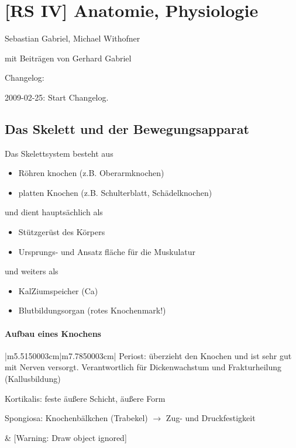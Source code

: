 \documentclass{article}
\begin{document}
\section{[RS IV] Anatomie, Physiologie}
Sebastian Gabriel, Michael Withofner

mit Beitr\"agen von Gerhard Gabriel

Changelog:

2009-02-25: Start Changelog.

\subsection{Das Skelett und der Bewegungsapparat}
Das Skelettsystem besteht aus

\begin{itemize}
\item R\"ohren knochen (z.B. Oberarmknochen)

\item platten  Knochen (z.B. Schulterblatt,  Sch\"adelknochen)

\end{itemize}
und dient  haupts\"achlich als

\begin{itemize}
\item St\"utzger\"ust  des K\"orpers

\item Ursprungs-  und Ansatz fl\"ache f\"ur die Muskulatur

\end{itemize}
und weiters als

\begin{itemize}
\item KalZiumspeicher (Ca)

\item Blutbildungsorgan (rotes Knochenmark!)

\end{itemize}
\paragraph{Aufbau eines Knochens}
\begin{center}
\tablehead{}\begin{supertabular}{|m{5.5150003cm}|m{7.7850003cm}|}
\hline
{}Periost: \"uberzieht den Knochen und ist sehr gut mit
Nerven versorgt.  Verantwortlich f\"ur Dickenwachstum und
Frakturheilung (Kallusbildung)

Kortikalis: feste \"au{\ss}ere Schicht, \"au{\ss}ere
Form

Spongiosa: Knochenb\"alkchen
(Trabekel) ${\rightarrow}$ Zug- und Druckfestigkeit

 &
[Warning: Draw object ignored]

\\\hline
\end{supertabular}
\end{center}
\end{document}
